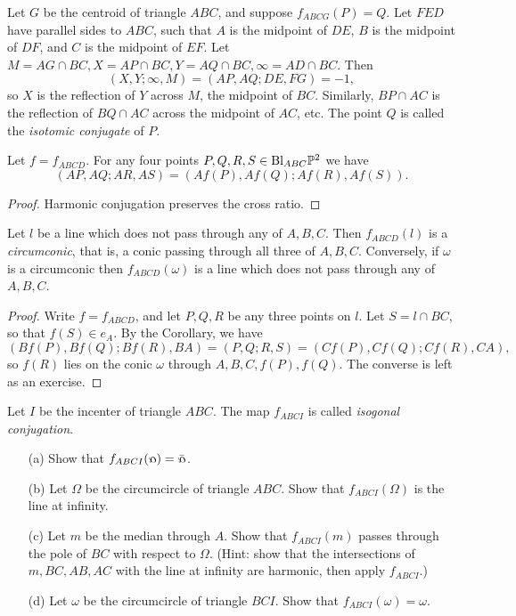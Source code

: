 \begin{ex} Let $G$ be the centroid of triangle $ABC$, and suppose $f_{ABCG}(P) = Q$. Let $FED$ have parallel sides to $ABC$, such that $A$ is the midpoint of $DE$, $B$ is the midpoint of $DF$, and $C$ is the midpoint of $EF$. Let $M = AG\cap BC, X = AP \cap BC, Y = AQ \cap BC,\infty = AD\cap BC$. Then
\[
(X,Y;\infty,M) = (AP,AQ;DE,FG) = -1,
\]
so $X$ is the reflection of $Y$ across $M$, the midpoint of $BC$. Similarly, $BP\cap AC$ is the reflection of $BQ\cap AC$ across the midpoint of $AC$, etc. The point $Q$ is called the \emph{isotomic conjugate} of $P$.
\end{ex}

\begin{cor}\label{cremona-cross} Let $f = f_{ABCD}$. For any four points $P,Q,R,S\in \text{\rm Bl}_{ABC}\mathbb{P}^2$ we have
\[
(AP,AQ;AR,AS) = (Af(P),Af(Q);Af(R),Af(S)).
\]
\end{cor}
\begin{proof} Harmonic conjugation preserves the cross ratio.
\end{proof}

\begin{thm}\label{cremona-conic} Let $l$ be a line which does not pass through any of $A,B,C$. Then $f_{ABCD}(l)$ is a \emph{circumconic}, that is, a conic passing through all three of $A,B,C$. Conversely, if $\omega$ is a circumconic then $f_{ABCD}(\omega)$ is a line which does not pass through any of $A,B,C$.
\end{thm}
\begin{proof} Write $f = f_{ABCD}$, and let $P,Q,R$ be any three points on $l$. Let $S = l\cap BC$, so that $f(S) \in e_A$. By the Corollary, we have
\[
(Bf(P),Bf(Q);Bf(R),BA) = (P,Q;R,S) = (Cf(P),Cf(Q);Cf(R),CA),
\]
so $f(R)$ lies on the conic $\omega$ through $A,B,C,f(P),f(Q)$. The converse is left as an exercise.
\end{proof}

\begin{exer} Let $I$ be the incenter of triangle $ABC$. The map $f_{ABCI}$ is called \emph{isogonal conjugation}.
\begin{itemize}
\item[(a)] Show that $f_{ABCI}(\fish) = \bar\fish$.

\item[(b)] Let $\Omega$ be the circumcircle of triangle $ABC$. Show that $f_{ABCI}(\Omega)$ is the line at infinity.

\item[(c)] Let $m$ be the median through $A$. Show that $f_{ABCI}(m)$ passes through the pole of $BC$ with respect to $\Omega$. (Hint: show that the intersections of $m, BC, AB, AC$ with the line at infinity are harmonic, then apply $f_{ABCI}$.)

\item[(d)] Let $\omega$ be the circumcircle of triangle $BCI$. Show that $f_{ABCI}(\omega) = \omega$.
\end{itemize}
\end{exer}

